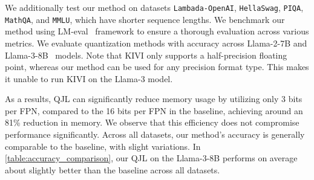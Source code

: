 \documentclass[11pt]{article}
\theoremstyle{plain}
\theoremstyle{definition}
\theoremstyle{remark}
\begin{document}
We additionally test our method on datasets \texttt{Lambada-OpenAI}, \texttt{HellaSwag}, \texttt{PIQA}, \texttt{MathQA}, and \texttt{MMLU}, which have shorter sequence lengths. We benchmark our method using {LM-eval}~\cite{evalharness} framework to ensure a thorough evaluation across various metrics. We evaluate quantization methods with accuracy across Llama-2-7B \cite{touvron2023llama} and Llama-3-8B~\cite{llama3} models. Note that KIVI only supports a half-precision floating point, whereas our method can be used for any precision format type. This makes it unable to run KIVI on the Llama-3 model.

As a results, QJL can significantly reduce memory usage by utilizing only 3 bits per FPN, compared to the 16 bits per FPN in the baseline, achieving around an 81\% reduction in memory. We observe that this efficiency does not compromise performance significantly. Across all datasets, our method's accuracy is generally comparable to the baseline, with slight variations. In \cref{table:accuracy_comparison}, our QJL on the Llama-3-8B performs on average about slightly better than the baseline across all datasets. 







\end{document}
